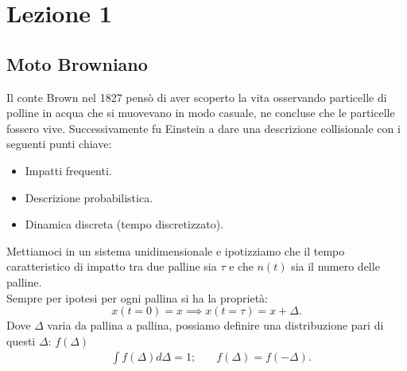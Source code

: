 \section{Lezione 1}%
\label{sub:Lezione 1}

\subsection{Moto Browniano}%
Il conte Brown nel 1827 pensò di aver scoperto la vita osservando particelle di polline in acqua che si muovevano in modo casuale, ne concluse che le particelle fossero vive. Successivamente fu Einstein a dare una descrizione collisionale con i seguenti punti chiave:
\begin{itemize}
    \item Impatti frequenti.
    \item Descrizione probabilistica.
    \item Dinamica discreta (tempo discretizzato).
\end{itemize}
Mettiamoci in un sistema unidimensionale e ipotizziamo che il tempo caratteristico di impatto tra due palline sia $\tau$ e che $n(t)$ sia il numero delle palline.\\
Sempre per ipotesi per ogni pallina si ha la proprietà:
\[
    x(t=0) = x \implies  x(t=\tau) = x + \Delta
.\] 
Dove $\Delta$ varia da pallina a pallina, possiamo definire una distribuzione pari di questi $\Delta$: $f(\Delta)$
\[\begin{aligned}
    &\int f(\Delta) d\Delta = 1; \quad &f(\Delta) = f(-\Delta) 
.\end{aligned}\]
